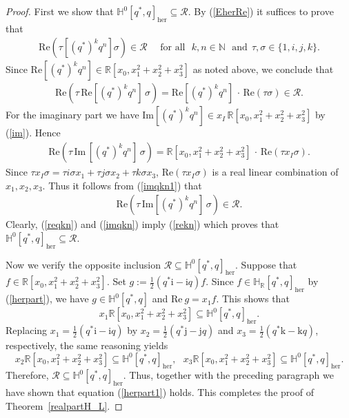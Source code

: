 \documentclass[11pt,a4paper]{amsart}
\theoremstyle{definition}
\begin{document}
\begin{proof}
First we show that
$ \mathbb{H}^{0}[q^{*}, q]_{\mathrm{her}}\subseteq \mathcal{R}$. By (\ref{EherRe})
it suffices to prove that
%
\begin{align}
\label{rekn}
\mathrm{Re} (\tau [ (q^{*})^{k}q^{n} ]\sigma ) \in \mathcal{R}\quad
\text{ for all} ~~~ k,n\in \mathbb{N}~~~\text{and}~~\tau , \sigma \in
\{1,i,j,k\}.
\end{align}
%
Since
$\mathrm{Re}[(q^{*})^{k}q^{n}] \in \mathbb{R}[x_{0},x_{1}^{2}+x_{2}^{2}+x_{3}^{2}]$
as noted above, we conclude that
%
\begin{align}
\label{reqkn}
\mathrm{Re} (\tau \, \mathrm{Re} [ (q^{*})^{k}q^{n} ]\,\sigma )=
\mathrm{Re} [ (q^{*})^{k}q^{n} ]\, \cdot \, \mathrm{Re} (\tau \sigma )
\in \mathcal{R}.
\end{align}
%
For the imaginary part we have
$\mathrm{Im}[(q^{*})^{k}q^{n}] \in x_{I} \, \mathbb{R}[x_{0},x_{1}^{2}+x_{2}^{2}+x_{3}^{2}]$
by (\ref{im}). Hence
%
\begin{align}
\label{imqkn1}
\mathrm{Re} (\tau \, \mathrm{Im} \, [ (q^{*})^{k}q^{n} ]\, \sigma )=
\mathbb{R}[x_{0},x_{1}^{2}+x_{2}^{2}+x_{3}^{2}]\, \cdot \,
\mathrm{Re} (\tau x_{I} \sigma ).
\end{align}
%
Since
$\tau x_{I} \sigma =\tau i \sigma x_{1}+ \tau j\sigma x_{2}+ \tau k
\sigma x_{3}$, $\mathrm{Re} (\tau x_{I} \sigma )$ is a real linear combination
of $x_{1},x_{2},x_{3}$. Thus it follows from (\ref{imqkn1}) that
%
\begin{align}
\label{imqkn}
\mathrm{Re} (\tau \, \mathrm{Im} [ (q^{*})^{k}q^{n} ]\,\sigma )\in
\mathcal{R}.
\end{align}
%
Clearly, (\ref{reqkn}) and (\ref{imqkn}) imply (\ref{rekn}) which proves
that $ \mathbb{H}^{0}[q^{*}, q]_{\mathrm{her}}\subseteq \mathcal{R}$.

Now we verify the opposite inclusion
$\mathcal{R}\subseteq \mathbb{H}^{0}[q^{*}, q]_{\mathrm{her}}$. Suppose
that $f\in \mathbb{R}[x_{0},x_{1}^{2}+x_{2}^{2}+x_{3}^{2}]$. Set
$g:=\frac{1}{2}(q^{*}\mathrm{i}-\mathrm{i}q) f$. Since
$f\in \mathbb{H}_{\mathbb{R}}[q^{*}, q]_{\mathrm{her}}$ by (\ref{herpart}),
we have $g\in \mathbb{H}^{0}[q^{*}, q]$ and
$\mathrm{Re} ~ g= x_{1} f$. This shows that
%
\begin{equation*}
x_{1} \mathbb{R}[x_{0},x_{1}^{2}+x_{2}^{2}+x_{3}^{2}] \subseteq
\mathbb{H}^{0}[q^{*}, q]_{\mathrm{her}}.
\end{equation*}
%
Replacing $x_{1}= \frac{1}{2}(q^{*}\mathrm{i}-\mathrm{i}q)$ by
$x_{2}= \frac{1}{2}(q^{*}\mathrm{j}- \mathrm{j}q) $ and
$x_{3}= \frac{1}{2}(q^{*}\mathrm{k}-\mathrm{k}q) $, respectively, the same
reasoning yields
%
\begin{equation*}
x_{2} \mathbb{R}[x_{0},x_{1}^{2}+x_{2}^{2}+x_{3}^{2}] \subseteq
\mathbb{H}^{0}[q^{*}, q]_{\mathrm{her}}, ~~~ x_{3} \mathbb{R}[x_{0},x_{1}^{2}+x_{2}^{2}+x_{3}^{2}]
\subseteq \mathbb{H}^{0}[q^{*}, q]_{\mathrm{her}}.
\end{equation*}
%
Therefore,
$\mathcal{R}\subseteq \mathbb{H}^{0}[q^{*}, q]_{\mathrm{her}}$. Thus, together
with the preceding paragraph we have shown that equation (\ref{herpart1})
holds. This completes the proof of Theorem~\ref{realpartH_L}.
\end{proof}
\end{document}
